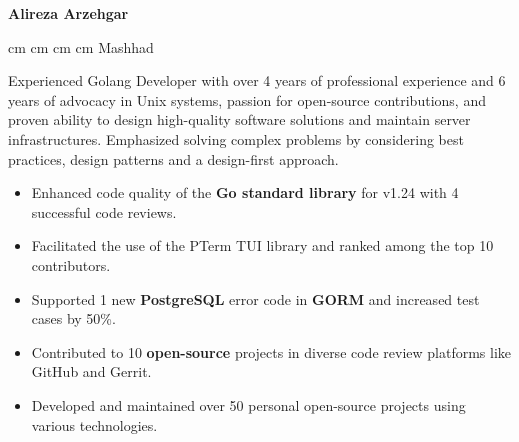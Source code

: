 \documentclass{engineercv}
\begin{document}
\begin{center}
  \textbf{\fontsize{24 pt}{24 pt}\selectfont Alireza Arzehgar}

  \vspace{0.2 cm}

  \scriptsize
  \mbox{}
   cm
  \mbox{}
   cm
  \mbox{}
   cm
  \mbox{}
   cm
  \mbox{{\color{black}\footnotesize\faMapMarker*}\hspace*{0.13cm}Mashhad}
\end{center}


Experienced Golang Developer with over 4 years of professional experience and 6 years of advocacy in Unix systems,
passion for open-source contributions, and proven ability to design high-quality software solutions and
maintain server infrastructures. Emphasized solving complex problems by considering best practices,
design patterns and a design-first approach.

\begin{itemize}
  \item Enhanced code quality of the \textbf{Go standard library} for v1.24 with 4 successful code reviews.
  \item Facilitated the use of the PTerm TUI library and ranked among the top 10 contributors.
  \item Supported 1 new \textbf{PostgreSQL} error code in \textbf{GORM} and increased test cases by 50\%.
  \item Contributed to 10 \textbf{open-source} projects in diverse code review platforms like GitHub and Gerrit.
  \item Developed and maintained over 50 personal open-source projects using various technologies.
\end{itemize}
\end{document}
